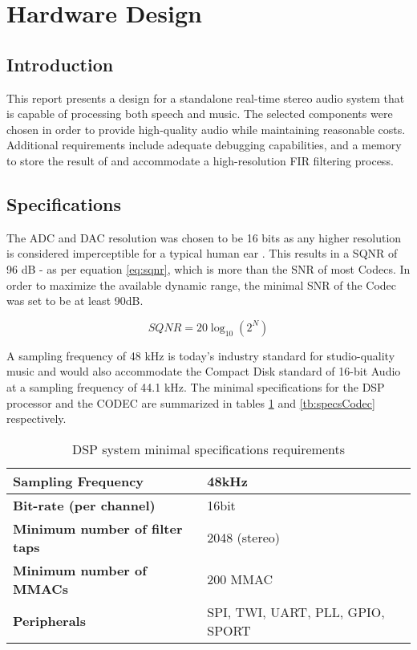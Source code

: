 \section{Hardware Design}

\subsection{Introduction}
This report presents a design for a standalone real-time stereo audio system that is capable of processing both speech and music. The selected components were chosen in order to provide high-quality audio while maintaining reasonable costs. Additional requirements include adequate debugging capabilities, and a memory to store the result of and accommodate a high-resolution FIR filtering process.


\subsection{Specifications}
The ADC and DAC resolution was chosen to be 16 bits as any higher resolution is considered imperceptible for a typical human ear \autocite{jackson2014}. This results in a SQNR of 96 dB - as per equation \ref{eq:sqnr}, which is more than the SNR of most Codecs. In order to maximize the available dynamic range, the minimal SNR of the Codec was set to be at least 90dB.

\begin{equation}\label{eq:sqnr}
SQNR = 20\log_{10}(2^N)    
\end{equation}


A sampling frequency of 48 kHz is today’s industry standard for studio-quality music \autocite{AES48khz} and would also accommodate the Compact Disk standard of 16-bit Audio at a sampling frequency of 44.1 kHz. The minimal specifications for the DSP processor and the CODEC are summarized in tables \ref{tb:specsDSP} and \ref{tb:specsCodec} respectively.




\begin{table}[h]
	\centering
	\begin{tabular}{|l|l|}
		\hline
		\textbf{Sampling Frequency}            & 48kHz                            \\ \hline
		\textbf{Bit-rate (per channel)}         & 16bit                            \\ \hline
		\textbf{Minimum number of filter taps} & 2048 (stereo)                    \\ \hline
		\textbf{Minimum number of MMACs}       & 200 MMAC                          \\ \hline
		\textbf{Peripherals}                   & SPI, TWI, UART, PLL, GPIO, SPORT \\ \hline
	\end{tabular}
	\caption{DSP system minimal specifications requirements}
	\label{tb:specsDSP}
\end{table}

